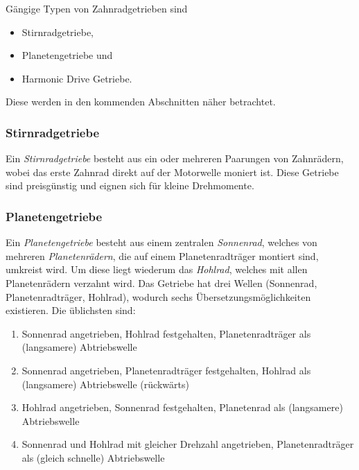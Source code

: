 			Gängige Typen von Zahnradgetrieben sind
			\begin{itemize}
				\item Stirnradgetriebe,
				\item Planetengetriebe und
				\item Harmonic Drive Getriebe.
			\end{itemize}
			Diese werden in den kommenden Abschnitten näher betrachtet.

			\subsubsection{Stirnradgetriebe}
				Ein \emph{Stirnradgetriebe} besteht aus ein oder mehreren Paarungen von Zahnrädern, wobei das erste Zahnrad direkt auf der Motorwelle moniert ist. Diese Getriebe sind preisgünstig und eignen sich für kleine Drehmomente.

			\subsubsection{Planetengetriebe}
				Ein \emph{Planetengetriebe} besteht aus einem zentralen \emph{Sonnenrad}, welches von mehreren \emph{Planetenrädern}, die auf einem Planetenradträger montiert sind, umkreist wird. Um diese liegt wiederum das \emph{Hohlrad}, welches mit allen Planetenrädern verzahnt wird. Das Getriebe hat drei Wellen (Sonnenrad, Planetenradträger, Hohlrad), wodurch sechs Übersetzungsmöglichkeiten existieren. Die üblichsten sind:
				\begin{enumerate}
					\item Sonnenrad angetrieben, Hohlrad festgehalten, Planetenradträger als (langsamere) Abtriebswelle
					\item Sonnenrad angetrieben, Planetenradträger festgehalten, Hohlrad als (langsamere) Abtriebswelle (rückwärts)
					\item Hohlrad angetrieben, Sonnenrad festgehalten, Planetenrad als (langsamere) Abtriebswelle
					\item Sonnenrad und Hohlrad mit gleicher Drehzahl angetrieben, Planetenradträger als (gleich schnelle) Abtriebswelle
				\end{enumerate}
				
